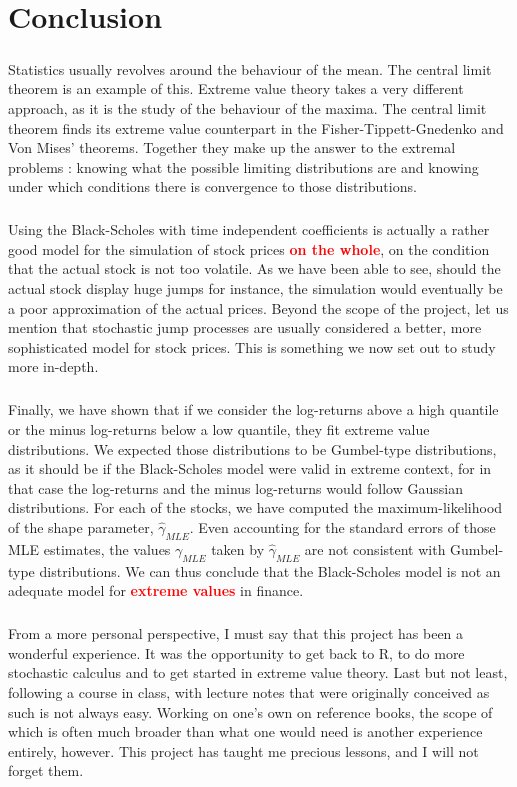 \chapter{Conclusion}
\paragraph{}
Statistics usually revolves around the behaviour of the mean. The central limit theorem is an example of this. Extreme value theory takes a very different approach, as it is the study of the behaviour of the maxima. The central limit theorem finds its extreme value counterpart in the Fisher-Tippett-Gnedenko and Von Mises' theorems. Together they make up the answer to the extremal problems : knowing what the possible limiting distributions are and knowing under which conditions there is convergence to those distributions.
\paragraph{}
Using the Black-Scholes with time independent coefficients is actually a rather good model for the simulation of stock prices \textbf{\textcolor{red}{on the whole}}, on the condition that the actual stock is not too volatile. As we have been able to see, should the actual stock display huge jumps for instance, the simulation would eventually be a poor approximation of the actual prices. Beyond the scope of the project, let us mention that stochastic jump processes are usually considered a better, more sophisticated model for stock prices. This is something we now set out to study more in-depth.
\paragraph{}
Finally, we have shown that if we consider the log-returns above a high quantile or the minus log-returns below a low quantile, they fit extreme value distributions. We expected those distributions to be Gumbel-type distributions, as it should be if the Black-Scholes model were valid in extreme context, for in that case the log-returns and the minus log-returns would follow Gaussian distributions. For each of the stocks, we have computed the maximum-likelihood of the shape parameter, $\hat{\gamma}_{MLE}$. Even accounting for the standard errors of those MLE estimates, the values $\gamma_{MLE}$ taken by $\hat{\gamma}_{MLE}$ are not consistent with Gumbel-type distributions. We can thus conclude that the Black-Scholes model is not an adequate model for  \textbf{\textcolor{red}{extreme values}} in finance.
\bigskip
\paragraph{}
From a more personal perspective, I must say that this project has been a wonderful experience. It was the opportunity to get back to R, to do more stochastic calculus and to get started in extreme value theory. Last but not least, following a course in class, with lecture notes that were originally conceived as such is not always easy. Working on one's own on reference books, the scope of which is often much broader than what one would need is another experience entirely, however. This project has taught me precious lessons, and I will not forget them.